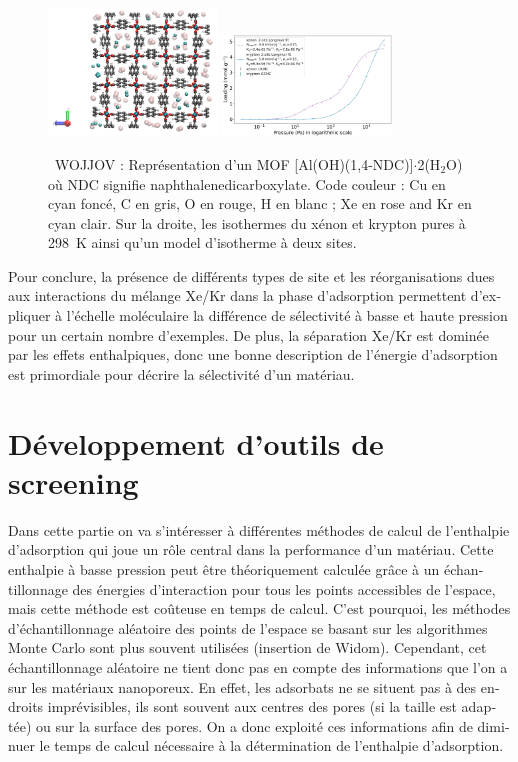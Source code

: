 \documentclass[thesis]{subfiles}
\begin{document}
\begin{otherlanguage}{french}
\begin{figure}[h]
\centering
  \includegraphics[width=0.4\textwidth]{figures/2-thermo/WOJJOV_clean.jpg}
  \includegraphics[width=0.4\textwidth]{figures/2-thermo/WOJJOV_clean_isotherm_xenon_krypton_298K.jpg}
  \caption{\small{\ WOJJOV : Représentation d'un MOF [Al(OH)(1,4-NDC)]$\cdot$2(H$_2$O) où NDC signifie naphthalenedicarboxylate. Code couleur : Cu en cyan foncé, C en gris, O en rouge, H en blanc ; Xe en rose and Kr en cyan clair. Sur la droite, les isothermes du xénon et krypton pures à \SI{298}{\kelvin} ainsi qu'un model d'isotherme à deux sites.}}
  \label{WOJJOV_resume}
\end{figure}

Pour conclure, la présence de différents types de site et les réorganisations dues aux interactions du mélange Xe/Kr dans la phase d'adsorption permettent d'expliquer à l'échelle moléculaire la différence de sélectivité à basse et haute pression pour un certain nombre d'exemples. De plus, la séparation Xe/Kr est dominée par les effets enthalpiques, donc une bonne description de l'énergie d'adsorption est primordiale pour décrire la sélectivité d'un matériau.

\section*{Développement d'outils de screening}

Dans cette partie on va s'intéresser à différentes méthodes de calcul de l'enthalpie d'adsorption qui joue un rôle central dans la performance d'un matériau. Cette enthalpie à basse pression peut être théoriquement calculée grâce à un échantillonnage des énergies d'interaction pour tous les points accessibles de l'espace, mais cette méthode est coûteuse en temps de calcul. C'est pourquoi, les méthodes d'échantillonnage aléatoire des points de l'espace se basant sur les algorithmes Monte Carlo sont plus souvent utilisées (insertion de Widom). Cependant, cet échantillonnage aléatoire ne tient donc pas en compte des informations que l'on a sur les matériaux nanoporeux. En effet, les adsorbats ne se situent pas à des endroits imprévisibles, ils sont souvent aux centres des pores (si la taille est adaptée) ou sur la surface des pores. On a donc exploité ces informations afin de diminuer le temps de calcul nécessaire à la détermination de l'enthalpie d'adsorption.


\end{otherlanguage}
\end{document}
